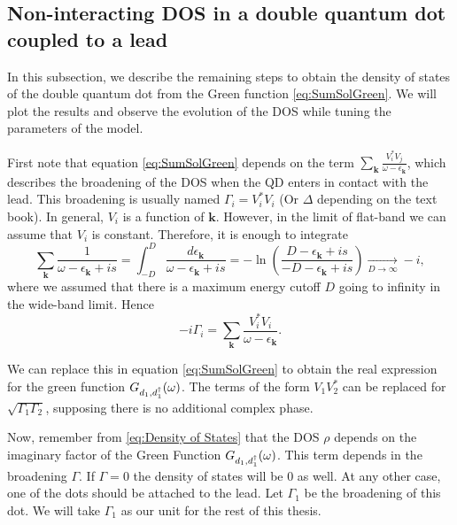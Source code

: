
\subsection{Non-interacting DOS in a  double quantum dot coupled to a lead \label{sec:GreedDQD}}


In this subsection, we describe the remaining steps to obtain the density of states of the double quantum dot from the Green function \eqref{eq:SumSolGreen}. We will plot the results and observe the evolution of the DOS while tuning the parameters of the model. 

First note that equation \eqref{eq:SumSolGreen} depends on the term $\sum_{\boldsymbol{k}}\frac{V_{i}^{*}V_{j}}{\omega-\epsilon_{\boldsymbol{k}}}$, which describes the broadening of the DOS when the QD enters in contact with the lead. This broadening is usually named $\Gamma_i=V_{i}^{*}V_{i}$ (Or $\Delta$ depending on the text book). 
In general, $V_i$  is a function of $\textbf{k}$. However, in the limit of flat-band we can assume that $V_i $ is constant. Therefore, it is enough to integrate
\begin{equation}
    \sum_{\boldsymbol{k}}\frac{1}{\omega-\epsilon_{\boldsymbol{k}}+is}=\int_{-D}^{D}\frac{d\epsilon_{\boldsymbol{k}}}{\omega-\epsilon_{\boldsymbol{k}}+is}=-\ln\left(\frac{D-\epsilon_{\boldsymbol{k}}+is}{-D-\epsilon_{\boldsymbol{k}}+is}\right)\xrightarrow[D\rightarrow\infty]{}-i , 
\end{equation}
\noindent where we assumed that there is a maximum  energy cutoff $D$ going to infinity in the wide-band limit. Hence 
\begin{equation}
   -i\Gamma_i = \sum_{\boldsymbol{k}}\frac{V_{i}^{*}V_{i}}{\omega-\epsilon_{\boldsymbol{k}}}.
\end{equation}



We can replace this in equation \eqref{eq:SumSolGreen} to obtain the real expression for the green function $G_{d_1,d_1^\dagger}(\omega)$. The terms of the form $V_1V_2^*$ can be replaced for $\sqrt{\Gamma_1\Gamma_2}$, supposing there is no additional complex phase.

Now, remember from \eqref{eq:Density of States} that the DOS $\rho$ depends on the imaginary factor of the Green Function $G_{d_1,d_1^\dagger}(\omega)$. This term depends in the broadening $\Gamma$. If $\Gamma = 0$ the density of states will be $0$ as well. At any other case, one of the dots should be attached to the lead. Let $\Gamma_1$ be the broadening of this dot. We will take $\Gamma_1$ as our  unit for the rest of this thesis.  


